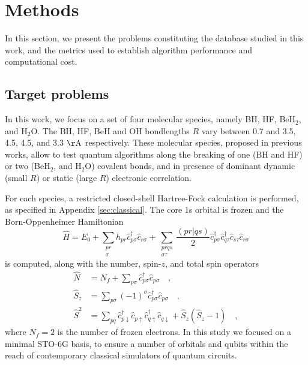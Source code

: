 \documentclass[aps,pra,onecolumn]{revtex4-2}
\newcommand{\crt}[1]{\hat{c}_{#1}^\dagger}
\newcommand{\dst}[1]{\hat{c}_{#1}^{\phantom{\dagger}}}
\newcommand{\ang}{\mathrm{\AA}}
\begin{document}
\section{Methods}
\label{sec:methods}

In this section, we present the problems constituting the database studied in this work,
and the metrics used to establish algorithm performance and computational cost.

\subsection{Target problems}

In this work, we focus on a set of four molecular species, namely BH, HF, BeH$_2$, and H$_2$O.
The BH, HF, BeH and OH bondlengths $R$ vary between 0.7 and 3.5, 4.5, 4.5, and 3.3 $\ang$ respectively.
These molecular species, proposed in previous works, allow to test quantum algorithms along the breaking of one (BH and HF) or two (BeH$_2$, and H$_2$O) covalent bonds,
and in presence of dominant dynamic (small $R$) or static (large $R$) electronic correlation.

For each species, a restricted closed-shell Hartree-Fock calculation is performed, as specified in Appendix \ref{sec:classical}.
The core 1s orbital is frozen and the Born-Oppenheimer Hamiltonian
\begin{equation}
\label{eq:hamiltonian}
\hat{H} = E_0 + \sum_{\substack{p r \\ \sigma}} h_{p r} \crt{p \sigma} \dst{r \sigma} + \sum_{\substack{p r q s \\ \sigma\tau}} \frac{(pr|qs)}{2} \crt{p \sigma} \crt{q \tau} \dst{s\tau}  \dst{r \sigma}
\end{equation}
is computed, along with the number, spin-$z$, and total spin operators
\begin{equation}
\label{eq:auxiliary}
\begin{split}
\hat{N} &= N_f + \sum_{p \sigma} \crt{p \sigma} \dst{p \sigma} \quad, \\
\hat{S}_z &= \sum_{p \sigma} (-1)^\sigma \crt{p \sigma} \dst{p \sigma} \quad, \\
\hat{S}^2 &= \sum_{pq} \crt{p\downarrow} \dst{p\uparrow} \crt{q\uparrow} \dst{q\downarrow}   + \hat{S}_z (\hat{S}_z-1) \quad,
\end{split}
\end{equation}
where $N_f = 2$ is the number of frozen electrons. 
In this study we focused on a minimal STO-6G basis, to ensure a number of orbitals and qubits within the reach of contemporary classical simulators of quantum circuits.
\end{document}
